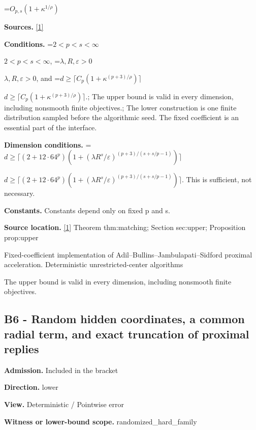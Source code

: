 \documentclass[10pt,a4paper]{article}
\newcommand{\AtlasMath}[1]{\par\begingroup\centering\setbox0=\hbox{$\displaystyle #1$}\ifdim\wd0>1.4\linewidth\typeout{ATLAS WIDE FORMULA: \the\wd0}\fi\ifdim\wd0>\linewidth\resizebox{\linewidth}{!}{\box0}\else\box0\fi\par\endgroup}
\newcommand{\AtlasInlineMath}[1]{\begingroup\setbox0=\hbox{$#1$}\ifdim\wd0>.4\linewidth\endgroup\AtlasMath{#1}\else\endgroup$#1$\fi}
\begin{document}
\AtlasMath{O_{p,s}(1+\kappa^{1/\rho})}


\textbf{Sources.} \href{https://github.com/WU-Wendao/Colombo/blob/main/colombo_sensorium/Complexity_altas/data/sources/colombo/B2/manuscript.pdf}{[1]}



\textbf{Conditions.} \AtlasInlineMath{2<p<s<\infty}, \AtlasInlineMath{\lambda,R,\varepsilon>0}, and \AtlasInlineMath{d\ge\lceil C_p(1+\kappa^{(p+3)/\rho})\rceil}.; The upper bound is valid in every dimension, including nonsmooth finite objectives.; The lower construction is one finite distribution sampled before the algorithmic seed. The fixed coefficient is an essential part of the interface.



\textbf{Dimension conditions.} \AtlasInlineMath{d\ge\lceil(2+12\cdot64^p)(1+(\lambda R^s/\varepsilon)^{(p+3)/(s+s/p-1)})\rceil}. This is sufficient, not necessary.



\textbf{Constants.} Constants depend only on fixed p and s.



\textbf{Source location.} \href{https://github.com/WU-Wendao/Colombo/blob/main/colombo_sensorium/Complexity_altas/data/sources/colombo/B2/manuscript.pdf}{[1]} Theorem thm:matching; Section sec:upper; Proposition prop:upper



Fixed-coefficient implementation of Adil--Bullins--Jambulapati--Sidford proximal acceleration. Deterministic unrestricted-center algorithms



The upper bound is valid in every dimension, including nonsmooth finite objectives.



\subsection{B6 - Random hidden coordinates, a common radial term, and exact truncation of proximal replies}


\textbf{Admission.} Included in the bracket



\textbf{Direction.} lower



\textbf{View.} Deterministic / Pointwise error



\textbf{Witness or lower-bound scope.} randomized\_hard\_family
\end{document}
